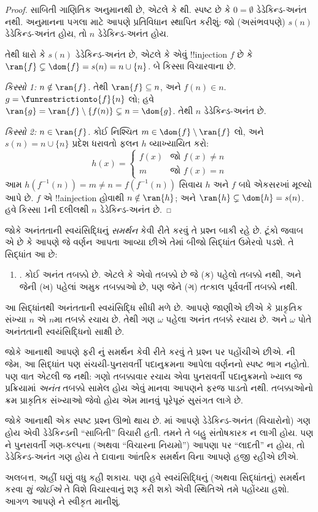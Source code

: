 \documentclass[../../../include/open-logic-section]{subfiles}
\begin{document}
\begin{proof}
સાબિતી ગાણિતિક અનુમાનથી છે, એટલે કે
થી.
સ્પષ્ટ છે કે $0
= \emptyset$ ડેડેકિન્ડ-અનંત નથી. અનુમાનના પગલા માટે આપણે
પ્રતિવિધાન સ્થાપિત કરીશું: જો (અસંભવપણે) $s(n)$ ડેડેકિન્ડ-અનંત
હોય, તો $n$ ડેડેકિન્ડ-અનંત હોય.

તેથી ધારો કે $s(n)$ ડેડેકિન્ડ-અનંત છે, એટલે કે એવું !!{injection}
$f$ છે કે $\ran{f}\subsetneq \dom{f} = s(n) = n \cup
\{n\}$. બે કિસ્સા વિચારવાના છે.

\emph{કિસ્સો 1: $n \notin \ran{f}$.} તેથી $\ran{f} \subseteq n$,
અને $f(n) \in n$. $g = \funrestrictionto{f}{n}$ લો; હવે $\ran{g} =
\ran{f} \setminus \{f(n)\} \subsetneq n = \dom{g}$.
તેથી $n$ ડેડેકિન્ડ-અનંત છે.

\emph{કિસ્સો 2: $n \in \ran{f}$.} કોઈ નિશ્ચિત
$m \in \dom{f} \setminus \ran{f}$ લો, અને
$s(n) = n \cup \{n\}$ પ્રદેશ ધરાવતો ફલન $h$ વ્યાખ્યાયિત કરો:
\[
h(x) =
	\begin{cases}
		f(x) & \text{જો }f(x) \neq n\\
		m & \text{જો }f(x)=n
	\end{cases}
\]
આમ $h(f^{-1}(n)) = m
\neq n = f(f^{-1}(n))$ સિવાય $h$ અને $f$ બધે એકસરખાં મૂલ્યો
આપે છે. $f$ એ !!a{injection} હોવાથી $n \notin
\ran{h}$; અને $\ran{h} \subsetneq \dom{h} = s(n)$.
હવે કિસ્સા 1ની દલીલથી $n$ ડેડેકિન્ડ-અનંત છે.
\end{proof}

જોકે અનંતતાની સ્વયંસિદ્ધિનું \emph{સમર્થન} કેવી રીતે કરવું તે
પ્રશ્ન બાકી રહે છે. ટૂંકો જવાબ એ છે કે આપણે જે વર્ણન આપતા આવ્યા
છીએ તેમાં બીજો સિદ્ધાંત ઉમેરવો પડશે. તે સિદ્ધાંત આ છે:
\begin{enumerate}
	\item[] \stagesinf. કોઈ અનંત તબક્કો છે. એટલે કે એવો તબક્કો છે
જે (ક) પહેલો તબક્કો નથી, અને જેની (ખ) પહેલાં અમુક તબક્કાઓ છે,
પણ જેને (ગ) તત્કાલ પૂર્વવર્તી તબક્કો નથી.
\end{enumerate}
આ સિદ્ધાંતથી અનંતતાની સ્વયંસિદ્ધિ સીધી મળે છે. આપણે જાણીએ છીએ
કે પ્રાકૃતિક સંખ્યા $n$ એ $n$મા તબક્કે રચાય છે. તેથી ગણ
$\omega$ પહેલા અનંત તબક્કે રચાય છે. અને $\omega$ પોતે
અનંતતાની સ્વયંસિદ્ધિનો સાક્ષી છે.

જોકે આનાથી આપણે ફરી \stagesinf{}નું સમર્થન કેવી રીતે કરવું તે
પ્રશ્ન પર પહોંચીએ છીએ. \stagessucc{}ની જેમ, આ સિદ્ધાંત પણ
સંચયી-પુનરાવર્તી પદાનુક્રમના આપેલા વર્ણનનો સ્પષ્ટ ભાગ નહોતો.
પણ વાત એટલી જ નથી: ગણો તબક્કાવાર રચાય એવા પુનરાવર્તી
પદાનુક્રમનો ખ્યાલ જ પ્રક્રિયામાં \emph{અનંત} તબક્કો સામેલ હોય
એવું માનવા આપણને ફરજ પાડતો નથી. તબક્કાઓનો ક્રમ પ્રાકૃતિક
સંખ્યાઓ જેવો હોય એમ માનવું પૂરેપૂરું સુસંગત લાગે છે.

જોકે આનાથી એક સ્પષ્ટ પ્રશ્ન ઊભો થાય છે.
માં આપણે
ડેડેકિન્ડ-અનંત (વિચારોનો) ગણ હોય એવી ડેડેકિન્ડની “સાબિતી”
વિચારી હતી. તમને તે બહુ સંતોષકારક ન લાગી હોય. પણ
\stagesinf{}ને પુનરાવર્તી ગણ-કલ્પના (અથવા “વિચારના નિયમો”)
આપણા પર “લાદતી” ન હોય, તો ડેડેકિન્ડ-અનંત ગણ હોય તે દાવાના
આંતરિક સમર્થન વિના આપણે હજી રહીએ છીએ.

અલબત્ત, અહીં ઘણું વધુ કહી શકાય. પણ હવે સ્વયંસિદ્ધિનું
(અથવા સિદ્ધાંતનું) સમર્થન કરવા \emph{શું જોઈએ} તે વિશે
વિચારવાનું શરૂ કરી શકો એવી સ્થિતિએ તમે પહોંચ્યા હશો.
આગળ આપણે \stagesinf{}ને સ્વીકૃત માનીશું.
\end{document}
